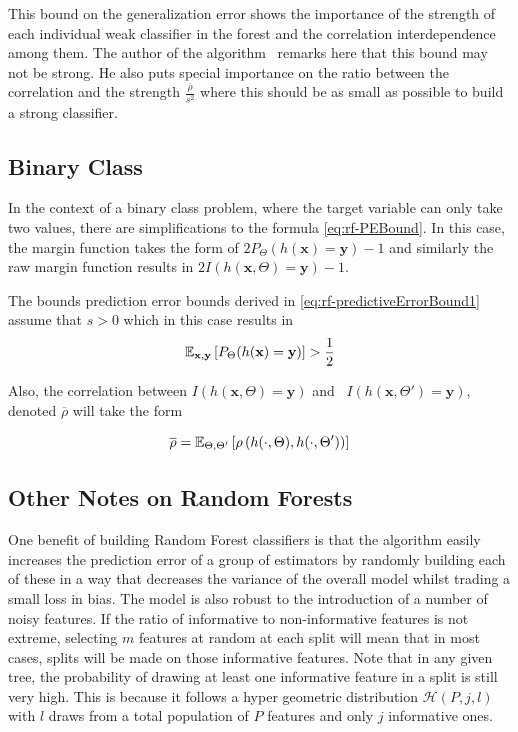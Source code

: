 This bound on the generalization error shows the importance of the strength of each individual weak classifier in the forest and the correlation interdependence among them. The author of the algorithm~\textcite{breiman-randomforests} remarks here that this bound may not be strong. He also puts special importance on the ratio between the correlation and the strength $\frac{\overline{\rho}}{s^2}$ where this should be as small as possible to build a strong classifier.


\subsection{Binary Class}
In the context of a binary class problem, where the target variable can only take two values, there are simplifications to the formula \cref{eq:rf-PEBound}. In this case, the margin function takes the form of $2 P_{\Theta}(h(\textbf{x}) = \textbf{y}) -1$ and similarly the raw margin function results in $2 I(h(\textbf{x}, \Theta) = \textbf{y}) -1$.


The bounds prediction error bounds derived in \cref{eq:rf-predictiveErrorBound1} assume that $s >0$ which in this case results in
\begin{equation}
\operatorname{\mathbb{E}}_{\textbf{x},\textbf{y}} \left[ P_{\Theta}(h(\textbf{x}) = \textbf{y}) \right] > \frac{1}{2}
\end{equation}


Also, the correlation between $I(h(\textbf{x}, \Theta) = \textbf{y})$ and \ $I(h(\textbf{x}, \Theta') = \textbf{y})$, denoted $\overline{\rho}$ will take the form

\begin{equation}
 \overline{\rho} = \operatorname{\mathbb{E}}_{\Theta,\Theta'} \left[ \rho \left( h(\cdot{},\Theta) ,h(\cdot{},\Theta') \right)  \right]
 \end{equation}



\subsection{Other Notes on Random Forests}
One benefit of building Random Forest classifiers is that the algorithm easily increases the prediction error of a group of estimators by randomly building each of these in a way that decreases the variance of the overall model whilst trading a small loss in bias. The model is also robust to the introduction of a number of noisy features. If the ratio of informative to non-informative features is not extreme, selecting $m$ features at random at each split will mean that in most cases, splits will be made on those informative features. Note that in any given tree, the probability of drawing at least one informative feature in a split is still very high. This is because it follows a hyper geometric distribution $\mathcal{H}(P,j,l)$ with $l$ draws from a total population of $P$ features and only $j$ informative ones.

